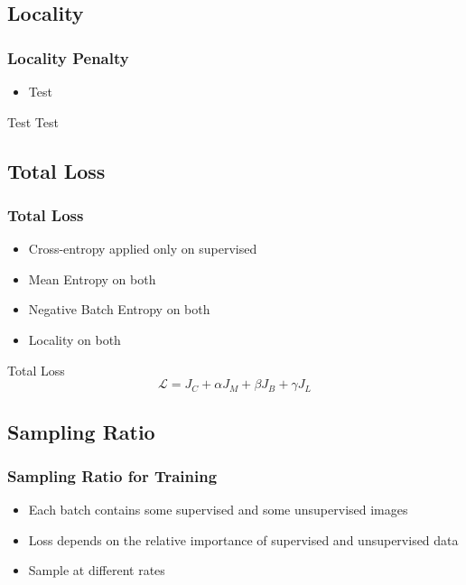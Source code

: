 \subsection{Locality}
\begin{frame}
	\frametitle{Locality Penalty}
	\begin{itemize}
		\item Test
	\end{itemize}
	\begin{block}{Test}
		Test
	\end{block}
\end{frame}

\subsection{Total Loss}
\begin{frame}
	\frametitle{Total Loss}
	\begin{itemize}
		\item Cross-entropy applied only on supervised
		\item Mean Entropy on both
		\item Negative Batch Entropy on both
		\item Locality on both
	\end{itemize}
	\begin{block}{Total Loss}
		\begin{equation*}
			\mathcal{L} = J_C + \alpha J_M + \beta J_B + \gamma J_L
		\end{equation*}
	\end{block}
\end{frame}

\subsection{Sampling Ratio}
\begin{frame}
	\frametitle{Sampling Ratio for Training}
	\begin{itemize}
		\item Each batch contains some supervised and some unsupervised images
		\item Loss depends on the relative importance of supervised and unsupervised data
		\item Sample at different rates
	\end{itemize}
\end{frame}

